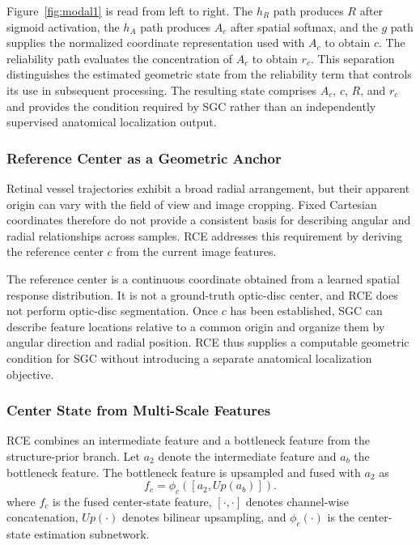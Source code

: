 \documentclass[a4paper,fleqn]{cas-sc}
\begin{document}
Figure~\ref{fig:modal1} is read from left to right.
The \(h_R\) path produces \(R\) after sigmoid activation, the \(h_A\) path produces \(A_c\) after spatial softmax, and the \(g\) path supplies the normalized coordinate representation used with \(A_c\) to obtain \(c\).
The reliability path evaluates the concentration of \(A_c\) to obtain \(r_c\).
This separation distinguishes the estimated geometric state from the reliability term that controls its use in subsequent processing.
The resulting state comprises \(A_c\), \(c\), \(R\), and \(r_c\) and provides the condition required by SGC rather than an independently supervised anatomical localization output.

\subsubsection{Reference Center as a Geometric Anchor}

Retinal vessel trajectories exhibit a broad radial arrangement, but their apparent origin can vary with the field of view and image cropping.
Fixed Cartesian coordinates therefore do not provide a consistent basis for describing angular and radial relationships across samples.
RCE addresses this requirement by deriving the reference center \(c\) from the current image features.

The reference center is a continuous coordinate obtained from a learned spatial response distribution.
It is not a ground-truth optic-disc center, and RCE does not perform optic-disc segmentation.
Once \(c\) has been established, SGC can describe feature locations relative to a common origin and organize them by angular direction and radial position.
RCE thus supplies a computable geometric condition for SGC without introducing a separate anatomical localization objective.

\subsubsection{Center State from Multi-Scale Features}

RCE combines an intermediate feature and a bottleneck feature from the structure-prior branch.
Let \(a_2\) denote the intermediate feature and \(a_b\) the bottleneck feature.
The bottleneck feature is upsampled and fused with \(a_2\) as
\begin{equation}
    f_c = \phi_c([a_2, Up(a_b)]).
    \label{eq:rce-feature-fusion}
\end{equation}
where \(f_c\) is the fused center-state feature, \([\cdot,\cdot]\) denotes channel-wise concatenation, \(Up(\cdot)\) denotes bilinear upsampling, and \(\phi_c(\cdot)\) is the center-state estimation subnetwork.
\end{document}
